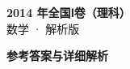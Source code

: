 \documentclass[zihao=-4, a4paper]{ctexart}
\begin{document}
\begin{center}
  {\Large\bfseries 2014 年全国Ⅰ卷（理科）}\\[4pt]
  {\large 数学 · 解析版}
\end{center}
\medskip
{}

\clearpage
{}
\begin{center}{\Large\bfseries 参考答案与详细解析}\end{center}
\medskip

\end{document}
